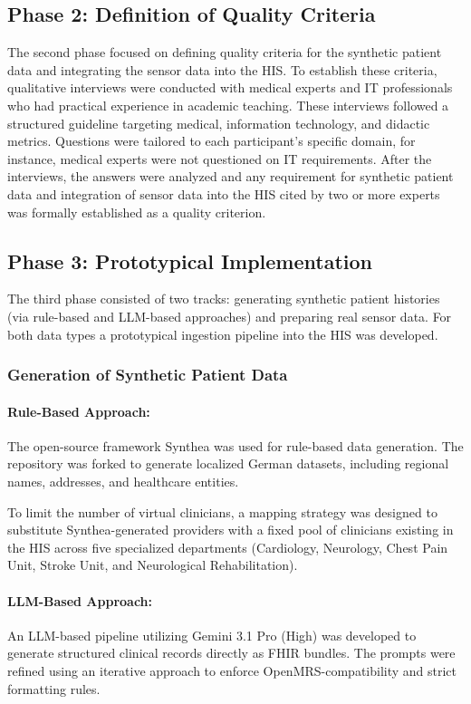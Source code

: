 \subsection*{Phase 2: Definition of Quality Criteria}
The second phase focused on defining quality criteria for the synthetic patient data and integrating the sensor data into the HIS. To establish these criteria, qualitative interviews were conducted with medical experts and IT professionals who had practical experience in academic teaching. These interviews followed a structured guideline targeting medical, information technology, and didactic metrics. Questions were tailored to each participant's specific domain, for instance, medical experts were not questioned on IT requirements. After the interviews, the answers were analyzed and any requirement for synthetic patient data and integration of sensor data into the HIS cited by two or more experts was formally established as a quality criterion.

\subsection*{Phase 3: Prototypical Implementation}
The third phase consisted of two tracks: generating synthetic patient histories (via rule-based and LLM-based approaches) and preparing real sensor data. For both data types a prototypical ingestion pipeline into the HIS was developed.

\subsubsection*{Generation of Synthetic Patient Data}
\paragraph*{Rule-Based Approach:}The open-source framework Synthea \citep{synthea} was used for rule-based data generation. The repository was forked to generate localized German datasets, including regional names, addresses, and healthcare entities.

To limit the number of virtual clinicians, a mapping strategy was designed to substitute Synthea-generated providers with a fixed pool of clinicians existing in the HIS across five specialized departments (Cardiology, Neurology, Chest Pain Unit, Stroke Unit, and Neurological Rehabilitation).

\paragraph*{LLM-Based Approach:} An LLM-based pipeline utilizing Gemini 3.1 Pro (High) was developed to generate structured clinical records directly as FHIR bundles. The prompts were refined using an iterative approach to enforce OpenMRS-compatibility and strict formatting rules. 

